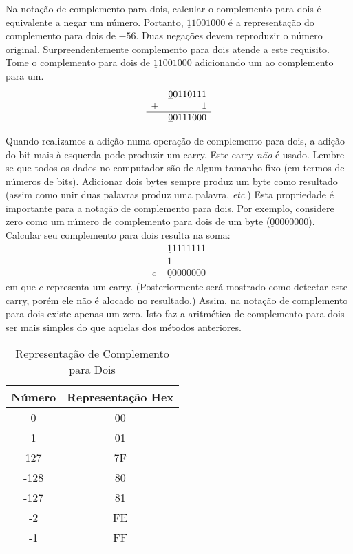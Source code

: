 Na notação de complemento para dois, calcular o complemento para dois é equivalente
a negar um número. Portanto, $\underline{1}1001000$ é a representação do complemento
para dois de $-56$. Duas negações devem reproduzir o número original.
Surpreendentemente complemento para dois atende a este requisito. Tome o complemento
para dois de $\underline{1}1001000$ adicionando um ao complemento para um.
\[
\begin{array}{rr}
 & \underline{0}0110111 \\
+&                    1 \\ \hline
 & \underline{0}0111000
\end{array}
\]

Quando realizamos a adição numa operação de complemento para dois, a adição
do bit mais à esquerda pode produzir um carry. Este carry \emph{não} é usado. 
Lembre-se que todos os dados no computador são de algum tamanho fixo (em termos de 
números de bits). Adicionar dois bytes sempre produz um byte como resultado (assim
como unir duas palavras produz uma palavra, {\em etc\/}.) Esta propriedade é importante 
para a notação de complemento para dois. Por exemplo, considere zero como um número de
complemento para dois de um byte ($\underline{0}0000000$). Calcular seu complemento para dois
resulta na soma:
\[
\begin{array}{rr}
 & \underline{1}1111111 \\
+&                    1 \\ \hline
c& \underline{0}0000000
\end{array}
\]
em que $c$ representa um carry. (Posteriormente será mostrado como detectar este carry,
porém ele não é alocado no resultado.) Assim, na notação de complemento para dois existe
apenas um zero. Isto faz a aritmética de complemento para dois ser mais simples do que aquelas 
dos métodos anteriores.

\begin{table}
\centering
\begin{tabular}{||c|c||}
\hline
Número & Representação Hex \\
\hline
0 & 00 \\
1 & 01 \\
127 & 7F \\
-128 & 80 \\
-127 & 81 \\
-2 & FE \\
-1 & FF \\
\hline
\end{tabular}
\caption{Representação de Complemento para Dois \label{tab:twocomp}}
\end{table}

